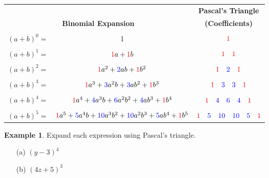\documentclass{report}
\theoremstyle{definition}
\newtheorem{example}{\bf Example}
\begin{document}
\begin{center}
	\begin{tabular}{|lc|c|}
	\hline
	&&\textbf{Pascal's Triangle}\\
	\multicolumn{2}{|c|}{\textbf{Binomial Expansion}}& \textbf{(Coefficients)}\\
	\hline
	&&\\
	$(a+b)^0=$&\color{red}1&$\color{red}1\color{black}$\\
	\hline
	&&\\
	$(a+b)^1=$&$\color{red}1\color{black}a+\color{red}1\color{black}b$&$\color{red}1\quad1\color{black}$\\
	\hline
	&&\\
	$(a+b)^2=$&$\color{red}1\color{black}a^2+\color{blue}2\color{black}ab+\color{red}1\color{black}b^2$&$\color{red}1\quad \color{blue}2 \quad \color{red}1\color{black} $\\
	\hline
	&&\\
	$(a+b)^3=$&$\color{red}1\color{black}a^3+\color{blue}3\color{black}a^2b+\color{blue}3\color{black}ab^2+\color{red}1\color{black}b^3$&$\color{red}1\quad\color{blue} 3\quad 3\quad\color{red}1\color{black}$\\
	\hline
	&&\\
	$(a+b)^4=$&$\color{red}1\color{black}a^4+\color{blue}4\color{black}a^3b+\color{blue}6\color{black}a^2b^2+\color{blue}4\color{black}ab^3+\color{red}1\color{black}b^4$&$\color{red}1\quad\color{blue}4\quad6\quad4\quad\color{red}1\color{black}$\\
	\hline
	&&\\
	$(a+b)^5=$&$\color{red}1\color{black}a^5+\color{blue}5\color{black}a^4b+\color{blue}10\color{black}a^3b^2+\color{blue}10\color{black}a^2b^3+\color{blue}5\color{black}ab^4+\color{red}1\color{black}b^5$&$\color{red}1\quad\color{blue}5\quad10\quad10\quad5\quad\color{red}1\color{black}$\\
	\hline
	\end{tabular}
\end{center}

\begin{example}
Expand each expression using Pascal's triangle.
\end{example}

\begin{minipage}[t]{0.5\linewidth}
	\begin{itemize}
		\item[(a)] $(y-3)^4$
	\end{itemize}
\end{minipage}
\vfill
\begin{minipage}[t]{0.5\linewidth}
	\begin{itemize}
		\item[(b)] $(4z+5)^3$
	\end{itemize}
\end{minipage}
\end{document}
